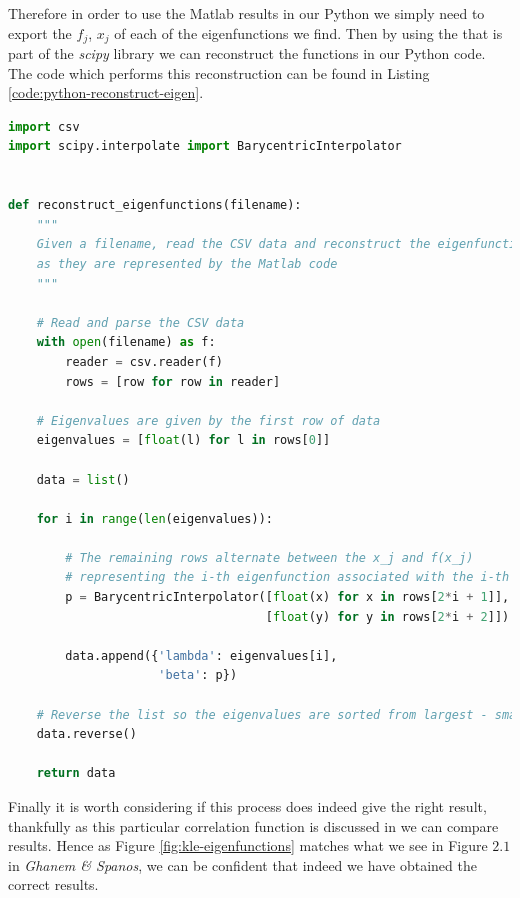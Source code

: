 Therefore in order to use the Matlab results in our Python we simply need to
export the $f_j$, $x_j$ of each of the eigenfunctions we find. Then by using
the  that is part of the \textit{scipy} library
\cite{scipy} we can reconstruct the functions in our Python code. The code
which performs this reconstruction can be found in Listing
\ref{code:python-reconstruct-eigen}.

\begin{lstlisting}[caption={Python code which reconstructs the eigenfunctions
                            we found using Matlab},
                   label={code:python-reconstruct-eigen},
                   language=Python]
import csv
import scipy.interpolate import BarycentricInterpolator


def reconstruct_eigenfunctions(filename):
    """
    Given a filename, read the CSV data and reconstruct the eigenfunctions
    as they are represented by the Matlab code
    """

    # Read and parse the CSV data
    with open(filename) as f:
        reader = csv.reader(f)
        rows = [row for row in reader]

    # Eigenvalues are given by the first row of data
    eigenvalues = [float(l) for l in rows[0]]

    data = list()

    for i in range(len(eigenvalues)):

        # The remaining rows alternate between the x_j and f(x_j)
        # representing the i-th eigenfunction associated with the i-th eigenvalue
        p = BarycentricInterpolator([float(x) for x in rows[2*i + 1]],
                                    [float(y) for y in rows[2*i + 2]])

        data.append({'lambda': eigenvalues[i],
                     'beta': p})

    # Reverse the list so the eigenvalues are sorted from largest - smallest
    data.reverse()

    return data
\end{lstlisting}

Finally it is worth considering if this process does indeed give the right
result, thankfully as this particular correlation function
 is discussed in
\cite{stochastic-fem} we can compare results. Hence as Figure
\ref{fig:kle-eigenfunctions} matches what we see in Figure $2.1$ in
\textit{Ghanem \& Spanos}, we can be confident that indeed we have obtained the
correct results.

